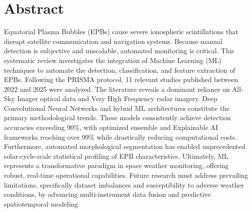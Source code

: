 \hypertarget{abstract}{%
\section{Abstract}\label{abstract}}

Equatorial Plasma Bubbles (EPBs) cause severe ionospheric scintillations
that disrupt satellite communication and navigation systems. Because
manual detection is subjective and unscalable, automated monitoring is
critical. This systematic review investigates the integration of Machine
Learning (ML) techniques to automate the detection, classification, and
feature extraction of EPBs. Following the PRISMA protocol, 11 relevant
studies published between 2022 and 2025 were analyzed. The literature
reveals a dominant reliance on All-Sky Imager optical data and Very High
Frequency radar imagery. Deep Convolutional Neural Networks and hybrid
ML architectures constitute the primary methodological trends. These
models consistently achieve detection accuracies exceeding 90\%, with
optimized ensemble and Explainable AI frameworks reaching over 99\%
while drastically reducing computational costs. Furthermore, automated
morphological segmentation has enabled unprecedented solar-cycle-scale
statistical profiling of EPB characteristics. Ultimately, ML represents
a transformative paradigm in space weather monitoring, offering robust,
real-time operational capabilities. Future research must address
prevailing limitations, specifically dataset imbalances and
susceptibility to adverse weather conditions, by advancing
multi-instrument data fusion and predictive spatiotemporal modeling.
